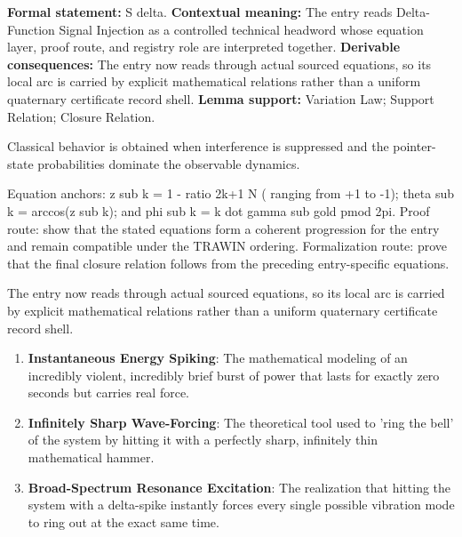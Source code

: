 \begingroup\footnotesize\setlength{\emergencystretch}{3em}\sloppy
\textbf{Formal statement:} S delta. \textbf{Contextual meaning:} The entry reads Delta-Function Signal Injection as a controlled technical headword whose equation layer, proof route, and registry role are interpreted together. \textbf{Derivable consequences:} The entry now reads through actual sourced equations, so its local arc is carried by explicit mathematical relations rather than a uniform quaternary certificate record shell. \textbf{Lemma support:} Variation Law; Support Relation; Closure Relation.\par
\endgroup

Classical behavior is obtained when interference is suppressed and the pointer-state probabilities dominate the observable dynamics.

Equation anchors: z sub k = 1 - ratio 2k+1 N ( ranging from +1 to -1); theta sub k = arccos(z sub k); and phi sub k = k dot gamma sub gold pmod 2pi. Proof route: show that the stated equations form a coherent progression for the entry and remain compatible under the TRAWIN ordering. Formalization route: prove that the final closure relation follows from the preceding entry-specific equations.

The entry now reads through actual sourced equations, so its local arc is carried by explicit mathematical relations rather than a uniform quaternary certificate record shell.
\endgroup

\begin{enumerate}[leftmargin=1.6em,itemsep=6pt,topsep=4pt]
\item \textbf{Instantaneous Energy Spiking}: The mathematical modeling of an incredibly violent, incredibly brief burst of power that lasts for exactly zero seconds but carries real force.
\item \textbf{Infinitely Sharp Wave-Forcing}: The theoretical tool used to 'ring the bell' of the system by hitting it with a perfectly sharp, infinitely thin mathematical hammer.
\item \textbf{Broad-Spectrum Resonance Excitation}: The realization that hitting the system with a delta-spike instantly forces every single possible vibration mode to ring out at the exact same time.
\end{enumerate}

